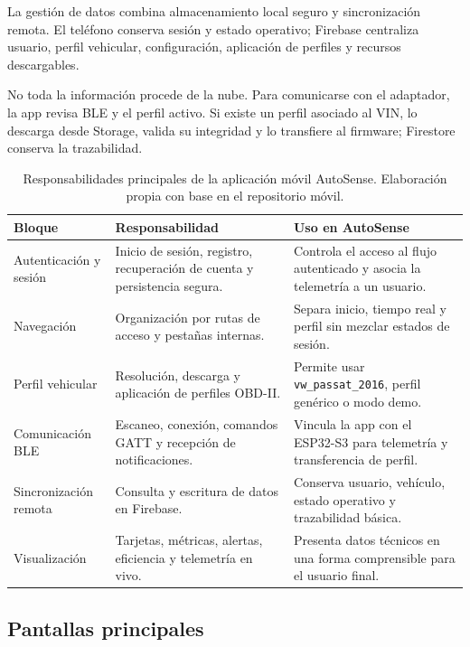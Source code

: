 \documentclass[12pt,letterpaper]{report}
\begin{document}
La gestión de datos combina almacenamiento local seguro y sincronización remota. El teléfono conserva sesión y estado operativo; Firebase centraliza usuario, perfil vehicular, configuración, aplicación de perfiles y recursos descargables.

No toda la información procede de la nube. Para comunicarse con el adaptador, la app revisa BLE y el perfil activo. Si existe un perfil asociado al VIN, lo descarga desde Storage, valida su integridad y lo transfiere al firmware; Firestore conserva la trazabilidad.

\begin{table}[!htbp]
\centering
\caption{Responsabilidades principales de la aplicación móvil AutoSense. Elaboración propia con base en el repositorio móvil.}
\label{tab:mobile-responsabilidades}
\small
\begin{tabular}{@{}p{}p{}p{}@{}}
\toprule
Bloque & Responsabilidad & Uso en AutoSense \\
\midrule
Autenticación y sesión & Inicio de sesión, registro, recuperación de cuenta y persistencia segura. & Controla el acceso al flujo autenticado y asocia la telemetría a un usuario. \\
Navegación & Organización por rutas de acceso y pestañas internas. & Separa inicio, tiempo real y perfil sin mezclar estados de sesión. \\
Perfil vehicular & Resolución, descarga y aplicación de perfiles OBD-II. & Permite usar \texttt{vw\_passat\_2016}, perfil genérico o modo demo. \\
Comunicación BLE & Escaneo, conexión, comandos GATT y recepción de notificaciones. & Vincula la app con el ESP32-S3 para telemetría y transferencia de perfil. \\
Sincronización remota & Consulta y escritura de datos en Firebase. & Conserva usuario, vehículo, estado operativo y trazabilidad básica. \\
Visualización & Tarjetas, métricas, alertas, eficiencia y telemetría en vivo. & Presenta datos técnicos en una forma comprensible para el usuario final. \\
\bottomrule
\end{tabular}
\end{table}

\subsection{Pantallas principales}
\end{document}
